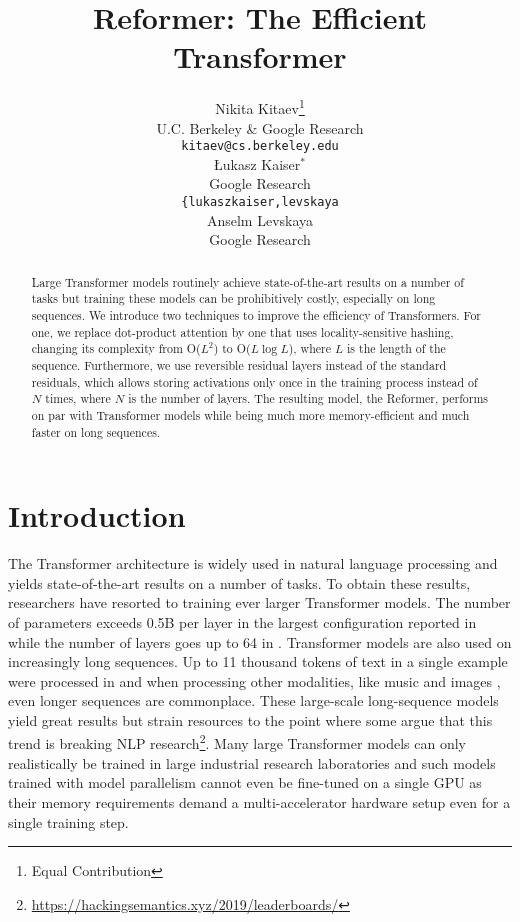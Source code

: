 \documentclass{article} \usepackage{iclr2020_conference,times}
\title{Reformer: The Efficient Transformer}
\author{Nikita Kitaev\thanks{Equal Contribution}  \\
U.C. Berkeley \& Google Research\\
\texttt{kitaev@cs.berkeley.edu} \\
\And 
\L{}ukasz Kaiser$^*$ \\
Google Research\\
\texttt{\{lukaszkaiser,levskaya\rlap{\}@google.com}} \\
\And 
Anselm Levskaya \\
Google Research\\
}
\begin{document}
\maketitle

\begin{abstract}
Large Transformer models routinely achieve state-of-the-art results on
a number of tasks but training these models can be prohibitively costly,
especially on long sequences. We introduce two techniques to improve
the efficiency of Transformers. For one, we replace dot-product attention
by one that uses locality-sensitive hashing, changing its complexity
from O($L^2$) to O($L\log L$), where $L$ is the length of the sequence.
Furthermore, we use reversible residual layers instead of the standard
residuals, which allows storing activations only once in the training
process instead of $N$ times, where $N$ is the number of layers.
The resulting model, the Reformer, performs on par with Transformer models
while being much more memory-efficient and much faster on long sequences.
\end{abstract}

\section{Introduction}

The Transformer architecture \citep{transformer} is widely used in natural language processing
and yields state-of-the-art results on a number of tasks. To obtain these results,
researchers have resorted to training ever larger Transformer models. The number of parameters exceeds
0.5B per layer in the largest configuration reported in \citep{meshtf} while the number
of layers goes up to 64 in \citep{chartransformer}. Transformer models are also used on
increasingly long sequences. Up to 11 thousand tokens of text in a single example were
processed in \citep{wikipedia} and when processing other modalities, like music \citep{huang2018music}
and images \citep{parmar2018imagetransformer}, even longer sequences are commonplace.
These large-scale long-sequence models yield great results but strain resources to
the point where some argue that this trend is breaking NLP
research\footnote{\url{https://hackingsemantics.xyz/2019/leaderboards/}}.
Many large Transformer models can only realistically be trained in large
industrial research laboratories and such models trained with model parallelism
cannot even be fine-tuned on a single GPU as their memory requirements demand a 
multi-accelerator hardware setup even for a single training step.
\end{document}
